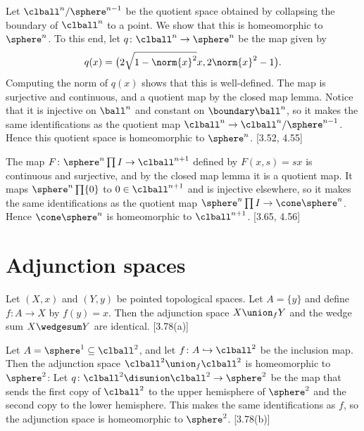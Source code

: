 \documentclass[article, a4paper, 11pt, oneside]{memoir}
\numberwithin{equation}{chapter}
\begin{document}
\begin{example}
    Let $\clball^n/\sphere^{n-1}$ be the quotient space obtained by collapsing the boundary of $\clball^n$ to a point. We show that this is homeomorphic to $\sphere^n$. To this end, let $q \colon \clball^n \to \sphere^n$ be the map given by
    \begin{equation*}
        q(x) = \bigl(
            2 \sqrt{1 - \norm{x}^2} x,
            2 \norm{x}^2 - 1
        \bigr).
    \end{equation*}
    Computing the norm of $q(x)$ shows that this is well-defined. The map is surjective and continuous, and a quotient map by the closed map lemma. Notice that it is injective on $\ball^n$ and constant on $\boundary\ball^n$, so it makes the same identifications as the quotient map $\clball^n \to \clball^n/\sphere^{n-1}$. Hence this quotient space is homeomorphic to $\sphere^n$. [3.52, 4.55]
\end{example}


\begin{example}
    The map $F \colon \sphere^n \prod I \to \clball^{n+1}$ defined by $F(x,s) = sx$ is continuous and surjective, and by the closed map lemma it is a quotient map. It maps $\sphere^n \prod \{0\}$ to $0 \in \clball^{n+1}$ and is injective elsewhere, so it makes the same identifications as the quotient map $\sphere^n \prod I \to \cone\sphere^n$. Hence $\cone\sphere^n$ is homeomorphic to $\clball^{n+1}$. [3.65, 4.56]
\end{example}


\chapter{Adjunction spaces}

\begin{example}
    Let $(X,x)$ and $(Y,y)$ be pointed topological spaces. Let $A = \{y\}$ and define $f \colon A \to X$ by $f(y) = x$. Then the adjunction space $X \union_f Y$ and the wedge sum $X \wedgesum Y$ are identical. [3.78(a)]
\end{example}

\begin{example}
    Let $A = \sphere^1 \subseteq \clball^2$, and let $f \colon A \hookrightarrow \clball^2$ be the inclusion map. Then the adjunction space $\clball^2 \union_f \clball^2$ is homeomorphic to $\sphere^2$: Let $q \colon \clball^2 \disunion \clball^2 \to \sphere^2$ be the map that sends the first copy of $\clball^2$ to the upper hemisphere of $\sphere^2$ and the second copy to the lower hemisphere. This makes the same identifications as $f$, so the adjunction space is homeomorphic to $\sphere^2$. [3.78(b)]
\end{example}
\end{document}
